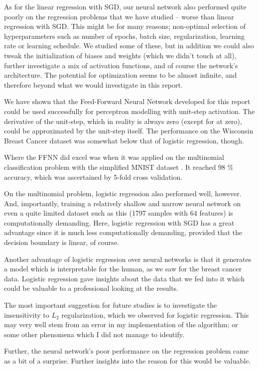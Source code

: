 \documentclass[]{article}
\begin{document}
As for the linear regression with SGD, our neural network also performed quite poorly on the regression problems that we have studied -- worse than linear regression with SGD. This might be for many reasons; non-optimal selection of hyperparameters such as number of epochs, batch size, regularization, learning rate or learning schedule. We studied some of these, but in addition we could also tweak the initialization of biases and weights (which we didn't touch at all), further investigate a mix of activation functions, and of course the network's architecture. The potential for optimization seems to be almost infinite, and therefore beyond what we would investigate in this report.

We have shown that the Feed-Forward Neural Network developed for this report could be used successfully for perceptron modelling with unit-step activation. The derivative of the unit-step, which in reality is always zero (except for at zero), could be approximated by the unit-step itself. The performance on the Wisconsin Breast Cancer dataset \cite{skl-datasets} was somewhat below that of logistic regression, though.

Where the FFNN did excel was when it was applied on the multinomial classification problem with the simplified MNIST dataset \cite{skl-datasets}. It reached 98 \% accuracy, which was ascertained by 5-fold cross validation.

On the multinomial problem, logistic regression also performed well, however. And, importantly, training a relatively shallow and narrow neural network on even a quite limited dataset such as this (1797 samples with 64 features) is computationally demanding. Here, logistic regression with SGD has a great advantage since it is much less computationally demanding, provided that the decision boundary is linear, of course.

Another advantage of logistic regression over neural networks is that it generates a model which is interpretable for the human, as we saw for the breast cancer data. Logistic regression gave insights about the data that we fed into it which could be valuable to a professional looking at the results.

\vspace{5mm}

The most important suggestion for future studies is to investigate the insensitivity to $L_2$ regularization, which we observed for logistic regression. This may very well stem from an error in my implementation of the algorithm; or some other phenomena which I did not manage to identify.

Further, the neural network's poor performance on the regression problem came as a bit of a surprise. Further insights into the reason for this would be valuable.



\end{document}
